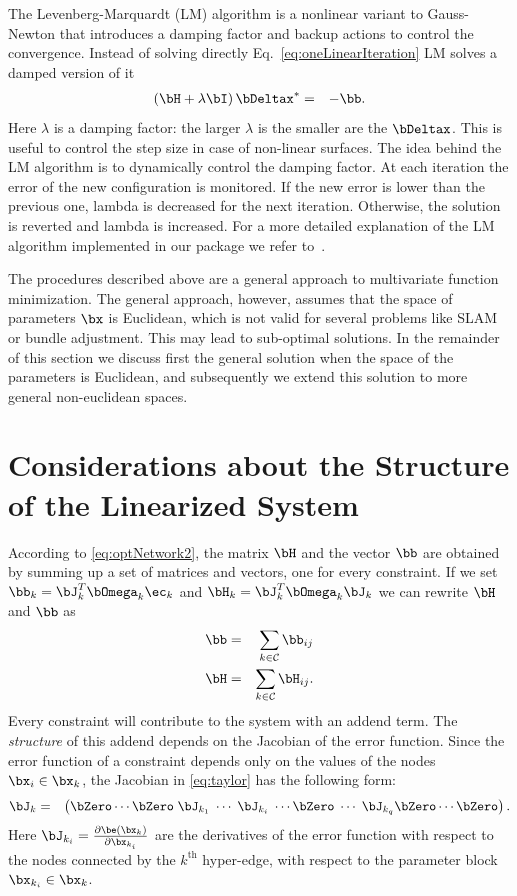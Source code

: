 \documentclass[a4paper]{article}
\begin{document}
The Levenberg-Marquardt (LM) algorithm is a nonlinear variant to Gauss-Newton that introduces 
a damping factor and backup actions to control the convergence.
Instead of solving directly Eq.~\ref{eq:oneLinearIteration}
LM solves a damped version of it
\begin{eqnarray}
       (\bH +\lambda \bI)\,\bDeltax^* &=& - \bb. 
\label{eq:oneLinearIterationLevenberg}
\end{eqnarray}
Here $\lambda$ is a damping factor: the larger $\lambda$ is the
smaller are the $\bDeltax$. This is useful to control the step size in
case of non-linear surfaces.  The idea behind the LM algorithm is to
dynamically control the damping factor.  At each iteration the error
of the new configuration is monitored.  If the new error is lower than
the previous one, lambda is decreased for the next iteration.
Otherwise, the solution is reverted and lambda is increased.
For a more detailed explanation of the LM algorithm implemented in our package
we refer to~\cite{lourakis2009toms}.

The procedures described above are a general approach to multivariate
function minimization. The general approach, however, assumes that the
space of parameters $\bx$ is Euclidean, which is not valid for several
problems like SLAM or bundle adjustment. This may lead to sub-optimal
solutions. In the remainder of this section we discuss first the
general solution when the space of the parameters is Euclidean, and
subsequently we extend this solution to more general non-euclidean
spaces.

\section{Considerations about the Structure of the Linearized System}
According to \eqref{eq:optNetwork2}, the matrix $\bH$ and the vector
$\bb$ are obtained by summing up a set of matrices and vectors, one
for every constraint.  If we set $\bb_{k}=\bJ_{k}^T \bOmega_{k}
\ec_{k}$ and $\bH_{k}= \bJ_{k}^T \bOmega_{k}\bJ_{k}$ we can
rewrite $\bH$ and $\bb$ as
\begin{eqnarray}
  \bb&=&\sum_{k \in\mathcal{C}} \bb_{ij}\\ 
  \bH&=&\sum_{k \in\mathcal{C}} \bH_{ij}. \label{eq:addendTerm}
\end{eqnarray}
Every constraint will contribute to the system with an addend
term. The \emph{structure} of this addend depends on the Jacobian of
the error function.  Since the error function of a constraint depends
only on the values of the nodes $\bx_i \in \bx_k$, the Jacobian in
\eqref{eq:taylor} has the following form:
\begin{eqnarray}
\bJ_{k} &=& \left(\bZero \cdots \bZero \; \bJ_{k_1} \; \cdots \; \bJ_{k_i} \;\cdots \bZero\; \cdots\;  \bJ_{k_q} \bZero \cdots \bZero \right).
\label{eq:jacExpanded}
\end{eqnarray}
Here $\bJ_{k_i}= \frac{\partial \be(\bx_k)}{\partial \bx_{k_i}}$ are the
derivatives of the error function with respect to the nodes connected
by the $k^\mathrm{th}$ hyper-edge, with respect to the parameter block
$\bx_{k_i} \in \bx_k$.
\end{document}
